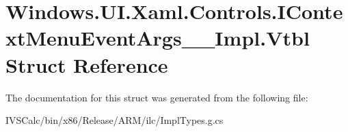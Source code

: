 \hypertarget{struct_windows_1_1_u_i_1_1_xaml_1_1_controls_1_1_i_context_menu_event_args_____impl_1_1_vtbl}{}\section{Windows.\+U\+I.\+Xaml.\+Controls.\+I\+Context\+Menu\+Event\+Args\+\_\+\+\_\+\+Impl.\+Vtbl Struct Reference}
\label{struct_windows_1_1_u_i_1_1_xaml_1_1_controls_1_1_i_context_menu_event_args_____impl_1_1_vtbl}


The documentation for this struct was generated from the following file\+:\begin{DoxyCompactItemize}
\item 
I\+V\+S\+Calc/bin/x86/\+Release/\+A\+R\+M/ilc/Impl\+Types.\+g.\+cs\end{DoxyCompactItemize}
